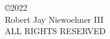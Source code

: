
\begin{center}
\begin{singlespace}
\copyright 2022\\
Robert Jay Niewoehner III \\
ALL RIGHTS RESERVED
\end{singlespace}
\end{center}

\clearpage
